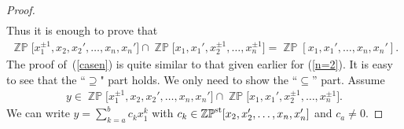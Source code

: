 \documentclass[10pt,a4paper]{amsart}
\numberwithin{equation}{section}
\begin{document}
\begin{proof}
\begin{gather*}
\end{gather*}
Thus it is enough to prove that
\begin{gather}\label{casen}
\mathop{\mathbb{ZP}}\!\big[x^{\pm1}_1,x_{2},x_{2}',\ldots,x_{n},x_{n}'\big] \cap\mathop{\mathbb{ZP}}\!\big[x_{1},x_{1}',x^{\pm1}_2,\ldots,x^{\pm1}_n\big] =\mathop{\mathbb{ZP}}[x_1,x_{1}',\ldots,x_{n},x_{n}'].
\end{gather}
The proof of~(\ref{casen}) is quite similar to that given earlier for (\ref{n=2}). It is easy to see that the ``$\supseteq$" part holds. We only need to show the ``$\subseteq$'' part. Assume{\samepage
\begin{gather*}
y\in \mathop{\mathbb{ZP}}\!\big[x^{\pm1}_1,x_{2},x_{2}',\ldots,x_{n},x_{n}'\big] \cap\mathop{\mathbb{ZP}}\!\big[x_{1},x_{1}',x^{\pm1}_2,\ldots,x^{\pm1}_n\big].
\end{gather*}
We can write $y=\sum\limits_{k=a}^{b}c_kx_{1}^{k}$ with $c_k\in\mathop{\mathbb{ZP}}\nolimits^{\rm st} [x_2,x'_2,\ldots,x_n,x'_n]$ and $c_a\neq0$.}


\end{proof}
\end{document}
